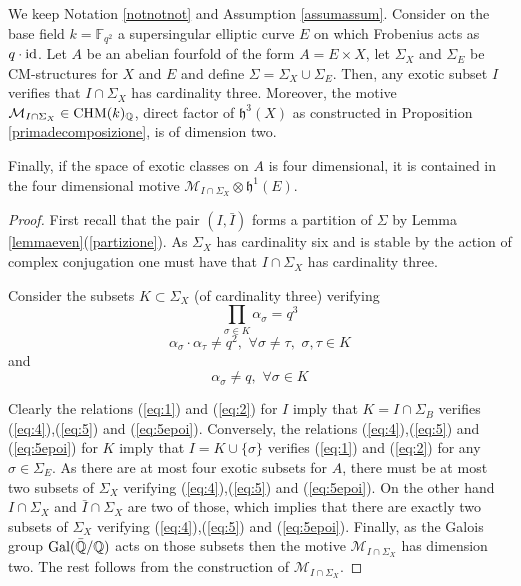 \documentclass[11pt]{amsart}
\begin{document}
\begin{lemma}
We keep Notation \ref{notnotnot} and Assumption \ref{assumassum}. Consider on the base field $k=\mathbb{F}_{q^2}$   a supersingular elliptic curve $E$  on which   Frobenius acts as $q\cdot \mathrm{id}$.
Let $A$ be an abelian fourfold of the form $ A=E\times X$, let  $\Sigma_X$ and $ \Sigma_E$ be CM-structures for $X$ and $E$ and define  $\Sigma=\Sigma_X \cup \Sigma_E$. Then, any exotic subset $I$ verifies that $I\cap \Sigma_X$ has cardinality three. Moreover,  the motive $\mathcal{M}_{I\cap \Sigma_X} \in\mathrm{CHM} (k)_{\mathbb{Q}}$, direct factor of $\mathfrak{h}^3(X)$ as constructed in Proposition \ref{primadecomposizione}, is of dimension two. 

Finally, if the space of exotic classes on $A$ is four dimensional, it is contained in the four dimensional motive $\mathcal{M}_{I\cap \Sigma_X} \otimes \mathfrak{h}^1(E)$.
\end{lemma}
\begin{proof}
First recall that  the pair $(I,\bar{I})$ forms a partition of $\Sigma$ by Lemma \ref{lemmaeven}(\ref{partizione}). As $ \Sigma_X$ has cardinality six and is stable by the action of complex conjugation one must have that $I\cap \Sigma_X$ has cardinality three.


Consider the subsets $K \subset \Sigma_X$ (of cardinality three) verifying
\begin{equation} \label{eq:4}
\prod_{\sigma \in K} \alpha_\sigma =q^3
\end{equation}
\begin{equation} \label{eq:5}
 \alpha_\sigma \cdot \alpha_\tau \neq q^2, \, \, \forall \sigma \neq \tau, \,\, \sigma,\tau \in K
\end{equation}
and
\begin{equation} \label{eq:5epoi}
 \alpha_\sigma  \neq q,  \,\, \forall \sigma\in K
\end{equation}

Clearly the relations (\ref{eq:1}) and (\ref{eq:2}) for $I$ imply that $K=I\cap \Sigma_B$ verifies (\ref{eq:4}),(\ref{eq:5}) and (\ref{eq:5epoi}). Conversely, the relations (\ref{eq:4}),(\ref{eq:5}) and (\ref{eq:5epoi})  for $K$ imply that $I=K\cup \{\sigma\}$ verifies (\ref{eq:1}) and (\ref{eq:2}) for any $\sigma \in \Sigma_E$. As there are at most four exotic subsets for $A$, there must be at most two subsets of $\Sigma_X$ verifying  (\ref{eq:4}),(\ref{eq:5}) and (\ref{eq:5epoi}).  On the other hand $I\cap \Sigma_X$  and $\bar{I}\cap \Sigma_X$ are two of those, which implies that there are exactly  two subsets of $\Sigma_X$  verifying (\ref{eq:4}),(\ref{eq:5}) and (\ref{eq:5epoi}).
Finally, as the Galois group $\textnormal{Gal}(\bar{\mathbb{Q}}/\mathbb{Q})$ acts on those subsets then the motive $\mathcal{M}_{I\cap \Sigma_X}$ has dimension two. 
The rest follows from the construction of $\mathcal{M}_{I\cap \Sigma_X}$.
\end{proof}
\end{document}
